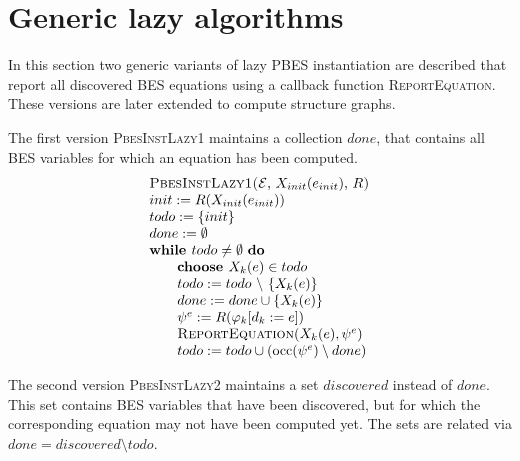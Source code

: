 \documentclass{article}
\begin{document}
\section{Generic lazy algorithms}

In this section two generic variants of lazy PBES instantiation are
described that report all discovered BES equations using a callback
function \textsc{ReportEquation}. These versions are later extended to compute
structure graphs.

The first version \textsc{PbesInstLazy1}
maintains a collection $done$, that contains all BES variables for
which an equation has been computed.%
\begin{equation*}
\begin{array}{l}
\text{\textsc{PbesInstLazy1(}}\mathcal{E}\text{, }X_{init}(e_{init})\text{, }%
R\text{\textsc{)}} \\
init:=R(X_{init}(e_{init})) \\
todo:=\{init\} \\
done:=\emptyset \\
\text{\textbf{while }}todo\neq \emptyset \text{ \textbf{do}} \\
\qquad \text{\textbf{choose }}X_{k}(e)\in todo \\
\qquad todo:=todo\ \backslash \ \{X_{k}(e)\} \\
\qquad done:=done\cup \{X_{k}(e)\} \\
\qquad \psi ^{e}:=R(\varphi _{k}[d_{k}:=e]) \\
\qquad \text{\textsc{ReportEquation}}(X_{k}(e),\psi ^{e}) \\
\qquad todo:=todo\cup (\mathrm{occ}(\psi ^{e})\setminus done)
\end{array}
\end{equation*}

The second version \textsc{PbesInstLazy2} maintains a set $discovered$
instead of $done$. This set contains BES
variables that have been discovered, but for which the corresponding
equation may not have been computed yet. The sets are related via
$done = discovered \setminus todo$.
\end{document}

